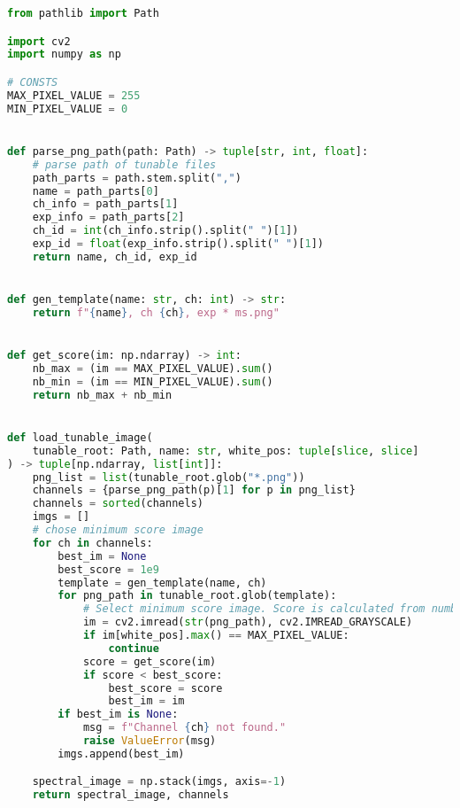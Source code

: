 \begin{lstlisting}[language=python, caption=Load Tunable Light Sources images, label={code:load-tunable}]
from pathlib import Path

import cv2
import numpy as np

# CONSTS
MAX_PIXEL_VALUE = 255
MIN_PIXEL_VALUE = 0


def parse_png_path(path: Path) -> tuple[str, int, float]:
    # parse path of tunable files
    path_parts = path.stem.split(",")
    name = path_parts[0]
    ch_info = path_parts[1]
    exp_info = path_parts[2]
    ch_id = int(ch_info.strip().split(" ")[1])
    exp_id = float(exp_info.strip().split(" ")[1])
    return name, ch_id, exp_id


def gen_template(name: str, ch: int) -> str:
    return f"{name}, ch {ch}, exp * ms.png"


def get_score(im: np.ndarray) -> int:
    nb_max = (im == MAX_PIXEL_VALUE).sum()
    nb_min = (im == MIN_PIXEL_VALUE).sum()
    return nb_max + nb_min


def load_tunable_image(
    tunable_root: Path, name: str, white_pos: tuple[slice, slice]
) -> tuple[np.ndarray, list[int]]:
    png_list = list(tunable_root.glob("*.png"))
    channels = {parse_png_path(p)[1] for p in png_list}
    channels = sorted(channels)
    imgs = []
    # chose minimum score image
    for ch in channels:
        best_im = None
        best_score = 1e9
        template = gen_template(name, ch)
        for png_path in tunable_root.glob(template):
            # Select minimum score image. Score is calculated from number of unvalid pixels
            im = cv2.imread(str(png_path), cv2.IMREAD_GRAYSCALE)
            if im[white_pos].max() == MAX_PIXEL_VALUE:
                continue
            score = get_score(im)
            if score < best_score:
                best_score = score
                best_im = im
        if best_im is None:
            msg = f"Channel {ch} not found."
            raise ValueError(msg)
        imgs.append(best_im)

    spectral_image = np.stack(imgs, axis=-1)
    return spectral_image, channels

\end{lstlisting}